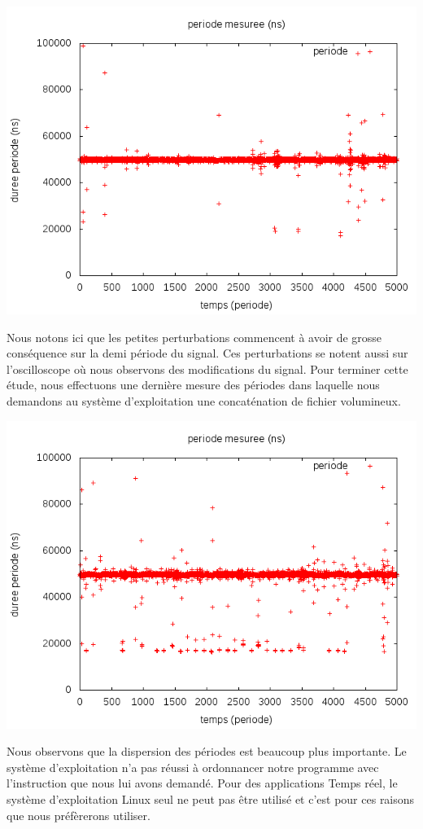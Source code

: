 \begin{center}
\includegraphics[width = \textwidth]{./I/images/delta1.png}
\end{center}
Nous notons ici que les petites perturbations commencent à avoir de grosse conséquence sur la demi période du signal. Ces perturbations se notent aussi sur l'oscilloscope où nous observons des modifications du signal. Pour terminer cette étude, nous effectuons une dernière mesure des périodes dans laquelle nous demandons au système d'exploitation une concaténation de fichier volumineux. 


\begin{center}
\includegraphics[width = \textwidth]{./I/images/delta_cat.png}
\end{center}

Nous observons que la dispersion des périodes est beaucoup plus importante. Le système d'exploitation n'a pas réussi à ordonnancer notre programme avec l'instruction que nous lui avons demandé. Pour des applications Temps réel, le système d'exploitation Linux seul ne peut pas être utilisé et c'est pour ces raisons que nous préfèrerons utiliser.